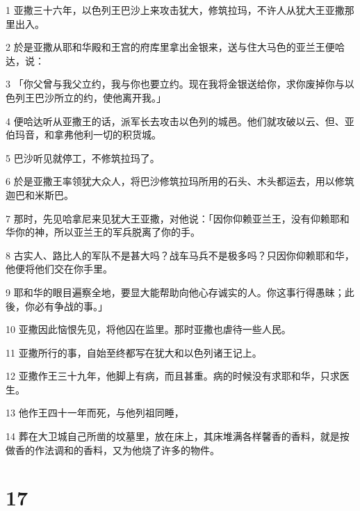 \par 1 亚撒三十六年，以色列王巴沙上来攻击犹大，修筑拉玛，不许人从犹大王亚撒那里出入。
\par 2 於是亚撒从耶和华殿和王宫的府库里拿出金银来，送与住大马色的亚兰王便哈达，说：
\par 3 「你父曾与我父立约，我与你也要立约。现在我将金银送给你，求你废掉你与以色列王巴沙所立的约，使他离开我。」
\par 4 便哈达听从亚撒王的话，派军长去攻击以色列的城邑。他们就攻破以云、但、亚伯玛音，和拿弗他利一切的积货城。
\par 5 巴沙听见就停工，不修筑拉玛了。
\par 6 於是亚撒王率领犹大众人，将巴沙修筑拉玛所用的石头、木头都运去，用以修筑迦巴和米斯巴。
\par 7 那时，先见哈拿尼来见犹大王亚撒，对他说：「因你仰赖亚兰王，没有仰赖耶和华你的神，所以亚兰王的军兵脱离了你的手。
\par 8 古实人、路比人的军队不是甚大吗？战车马兵不是极多吗？只因你仰赖耶和华，他便将他们交在你手里。
\par 9 耶和华的眼目遍察全地，要显大能帮助向他心存诚实的人。你这事行得愚昧；此後，你必有争战的事。」
\par 10 亚撒因此恼恨先见，将他囚在监里。那时亚撒也虐待一些人民。
\par 11 亚撒所行的事，自始至终都写在犹大和以色列诸王记上。
\par 12 亚撒作王三十九年，他脚上有病，而且甚重。病的时候没有求耶和华，只求医生。
\par 13 他作王四十一年而死，与他列祖同睡，
\par 14 葬在大卫城自己所凿的坟墓里，放在床上，其床堆满各样馨香的香料，就是按做香的作法调和的香料，又为他烧了许多的物件。

\chapter{17}

